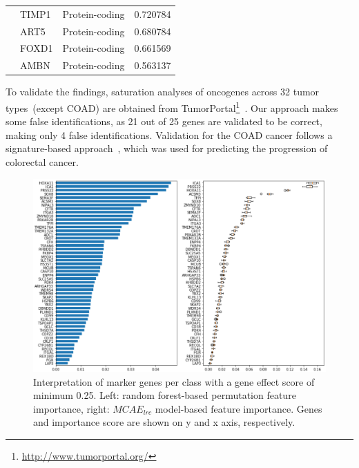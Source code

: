 \begin{table}
\begin{center}
\begin{tabular}{l|l|l|l}
        & TIMP1 & Protein-coding & 0.720784 \\ %
        & ART5 & Protein-coding & 0.680784 \\ %
        & FOXD1 & Protein-coding & 0.661569 \\ %
        & AMBN & Protein-coding & 0.563137 \\ %
        \bottomrule
        \end{tabular}
        \vspace{-4mm}
    \end{center}
\end{table}

\hspace*{3.5mm} To validate the findings, saturation analyses of oncogenes across 32 tumor types~(except COAD) are obtained from TumorPortal\footnote{ \url{http://www.tumorportal.org/}}~\cite{lawrence2014discovery}. Our approach makes some false identifications, as 21 out of 25 genes are validated to be correct, making only 4 false identifications. Validation for the COAD cancer follows a signature-based approach~\cite{zuo2019identification}, which was used for predicting the progression of colorectal cancer. 

\begin{figure}
\centering
	\includegraphics[scale=1.0]{images/rf_fi.png}
	\caption[Interpretation of marker genes]{Interpretation of marker genes per class with a gene effect score of minimum 0.25. Left: random forest-based permutation feature importance, right: $MCAE_{lrc}$ model-based feature importance. Genes and importance score are shown on y and x axis, respectively. }
    \label{fig:pfi}
\end{figure}

